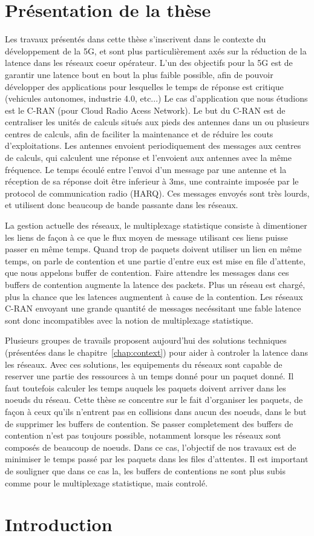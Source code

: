 
\chapter*{Présentation de la thèse}
\label{chap:intro}
\minitoc

Les travaux présentés dans cette thèse s'inscrivent dans le contexte du développement de la 5G, et sont plus particulièrement axés sur la réduction de la latence dans les réseaux coeur opérateur.
L'un des objectifs pour la 5G est de garantir une latence bout en bout la plus faible possible, afin de pouvoir développer des applications pour lesquelles le temps de réponse est critique (vehicules autonomes, industrie 4.0, etc...)
Le cas d'application que nous étudions est le C-RAN (pour Cloud Radio Acess Network). Le but du C-RAN est de centraliser les unités de calculs situés aux pieds des antennes dans un ou plusieurs centres de calculs, afin de faciliter la maintenance et de réduire les couts d'exploitations. Les antennes envoient periodiquement des messages aux centres de calculs, qui calculent une réponse et l'envoient aux antennes avec la même fréquence. Le temps écoulé entre l'envoi d'un message par une antenne et la réception de sa réponse doit être inferieur à 3ms, une contrainte imposée par le protocol de communication radio (HARQ). Ces messages envoyés sont très lourds, et utilisent donc beaucoup de bande passante dans les réseaux.

La gestion actuelle des réseaux, le multiplexage statistique consiste à dimentioner les liens de façon à ce que le flux moyen de message utilisant ces liens puisse passer en même temps. Quand trop de paquets doivent utiliser un lien en même temps, on parle de contention et une partie d'entre eux est mise en file d'attente, que nous appelons buffer de contention. Faire attendre les messages dans ces buffers de contention augmente la latence des packets. Plus un réseau est chargé, plus la chance que les latences augmentent à cause de la contention. Les réseaux C-RAN envoyant une grande quantité de messages necéssitant une fable latence sont donc incompatibles avec la notion de multiplexage statistique.

Plusieurs groupes de travails proposent aujourd'hui des solutions techniques (présentées dans le chapitre~\ref{chap:context}) pour aider à controler la latence dans les réseaux. Avec ces solutions, les equipements du réseaux sont capable de reserver une partie des ressources à un temps donné pour un paquet donné. Il faut toutefois calculer les temps auquels les paquets doivent arriver dans les noeuds du réseau. Cette thèse se concentre sur le fait d'organiser les paquets, de façon à ceux qu'ils n'entrent pas en collisions dans aucun des noeuds, dans le but de supprimer les buffers de contention. Se passer completement des buffers de contention n'est pas toujours possible, notamment lorsque les réseaux sont composés de beaucoup de noeuds. Dans ce cas, l'objectif de nos travaux est de minimiser le temps passé par les paquets dans les files d'attentes. Il est important de souligner que dans ce cas la, les buffers de contentions ne sont plus subis comme pour le multiplexage statistique, mais controlé.

\chapter*{Introduction}
\label{chap:intro}
\minitoc


